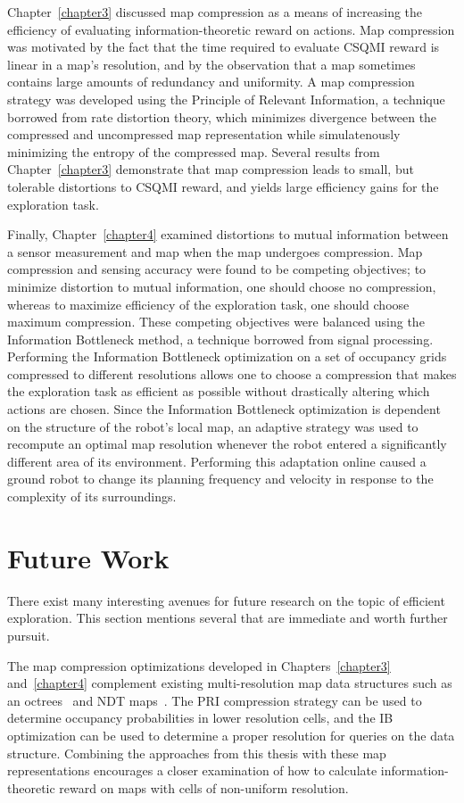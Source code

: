 Chapter~\ref{chapter3} discussed map compression as a means of increasing the
efficiency of evaluating information-theoretic reward on actions. Map
compression was motivated by the fact that the time required to evaluate CSQMI
reward is linear in a map's resolution, and by the observation that a map
sometimes contains large amounts of redundancy and uniformity. A map compression
strategy was developed using the Principle of Relevant Information, a technique
borrowed from rate distortion theory, which
minimizes divergence between the compressed and uncompressed map representation
while simulatenously minimizing the entropy of the compressed map.
Several results from Chapter~\ref{chapter3} demonstrate that map compression
leads to small, but tolerable distortions to CSQMI reward, and yields large
efficiency gains for the exploration task.

Finally, Chapter~\ref{chapter4} examined distortions to mutual information
between a sensor measurement and map when the map undergoes compression.
Map compression and sensing accuracy were found to be competing objectives; to
minimize distortion to mutual information, one should choose no compression,
whereas to maximize efficiency of the exploration task, one should choose
maximum compression. These competing objectives were balanced using the
Information Bottleneck method, a technique borrowed from signal processing.
Performing the Information Bottleneck optimization on a set of occupancy grids
compressed to different resolutions allows one to choose a compression that
makes the exploration task as efficient as possible without drastically altering which
actions are chosen. Since the Information Bottleneck optimization is dependent on the
structure of the robot's local map, an adaptive strategy was used to recompute
an optimal map resolution
whenever the robot entered a significantly different area of its environment. Performing this
adaptation online caused a ground robot to change its planning frequency and velocity
in response to the complexity of its surroundings.

\section{Future Work}
\label{sec:future_work}

There exist many interesting avenues for future research on the topic of
efficient exploration. This section mentions several that are immediate
and worth further pursuit.

The map compression optimizations developed in Chapters~\ref{chapter3}
and~\ref{chapter4} complement
existing multi-resolution map data structures such as an
octrees~\cite{wurm2010octomap} and NDT maps~\cite{saarinen2013normal}. The PRI compression
strategy can be used to determine occupancy probabilities in lower resolution
cells, and the IB optimization can be used to determine a proper resolution for
queries on the data structure. Combining the approaches from this thesis with these map
representations encourages a closer examination of how to calculate
information-theoretic reward on maps with cells of non-uniform resolution.

